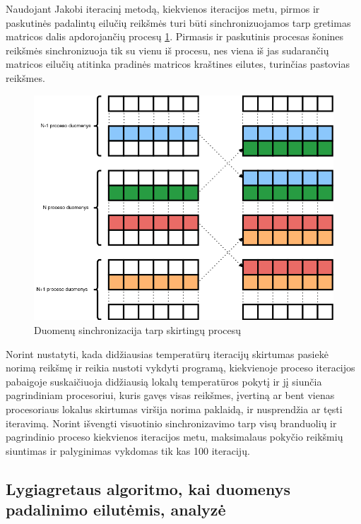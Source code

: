 \documentclass{VUMIFPSbakalaurinis}
\begin{document}
Naudojant Jakobi iteracinį metodą, kiekvienos iteracijos metu, pirmos ir paskutinės padalintų eilučių reikšmės turi būti sinchronizuojamos tarp gretimas matricos dalis apdorojančių procesų \ref{img:sync}. 
Pirmasis ir paskutinis procesas šonines reikšmės sinchronizuoja tik su vienu iš procesu, nes viena iš jas sudarančių matricos eilučių atitinka pradinės matricos kraštines eilutes, turinčias pastovias reikšmes.

\begin{figure}[H]
    \centering
    \includegraphics[scale=0.5]{img/sync.png}
    \caption{Duomenų sinchronizacija tarp skirtingų procesų}
    \label{img:sync}
\end{figure}

Norint nustatyti, kada didžiausias temperatūrų iteracijų skirtumas pasiekė norimą reikšmę ir reikia nustoti vykdyti programą, kiekvienoje proceso iteracijos pabaigoje suskaičiuoja didžiausią lokalų temperatūros pokytį ir jį siunčia pagrindiniam procesoriui, 
kuris gavęs visas reikšmes, įvertiną ar bent vienas procesoriaus lokalus skirtumas viršija norima paklaidą, ir nusprendžia ar tęsti iteravimą.
Norint išvengti visuotinio sinchronizavimo tarp visų branduolių ir pagrindinio proceso kiekvienos iteracijos metu, maksimalaus pokyčio reikšmių siuntimas ir palyginimas vykdomas tik kas 100 iteracijų.

\subsection{Lygiagretaus algoritmo, kai duomenys padalinimo eilutėmis, analyzė}
\end{document}
